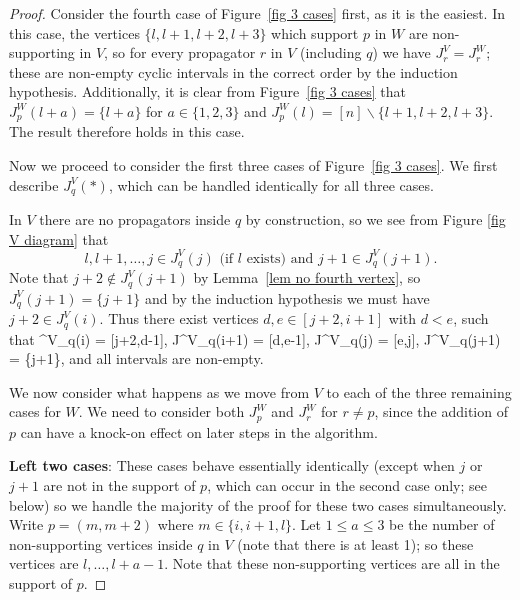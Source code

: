 \documentclass[11pt]{article}
\def\ba #1\ea{\begin{align} #1 \end{align}}
\theoremstyle{remark}
\theoremstyle{definition}
\begin{document}
\begin{proof}
Consider the fourth case of Figure~\ref{fig 3 cases} first, as it is the easiest.  In this case, the vertices ${\{l,l+1,l+2,l+3\}}$ which support $p$ in $W$ are non-supporting in $V$, so for every propagator $r$ in $V$ (including $q$) we have $J_r^{V} = J_r^{W}$; these are non-empty cyclic intervals in the correct order by the induction hypothesis.  Additionally, it is clear from Figure~\ref{fig 3 cases} that $J_p^{W}(l+a) = \{l+a\}$ for $a\in\{1,2,3\}$ and $J_p^{W}(l) = [n] \backslash \{l+1, l+2, l+3\}$. The result therefore holds in this case.


Now we proceed to consider the first three cases of Figure~\ref{fig 3 cases}.
We first describe $J_q^{V}(*)$, which can be handled identically for all three cases.

In $V$ there are no propagators inside $q$ by construction, so we see from Figure \ref{fig V diagram} that
\[l, l+1, \ldots ,j \in J^{V}_q(j) \text{ (if $l$ exists) and }  j+1 \in J^{V}_q(j+1).\]
Note that $j+2 \not\in J^{V}_q(j+1)$ by Lemma~\ref{lem no fourth vertex}, so  $J^{V}_q(j+1) = \{j+1\}$ and by the induction hypothesis we must have $j+2 \in J^{V}_q(i)$. Thus there exist vertices $d,e \in [j+2,i+1]$ with $d <e$, such that
\ba J^{V}_q(i) = [j+2,d-1], \quad J^{V}_q(i+1) = [d,e-1], \quad J^{V}_q(j) = [e,j], \quad J^{V}_q(j+1) = \{j+1\}, \label{deeqs}\ea
and all intervals are non-empty.




We now consider what happens as we move from $V$ to each of the three remaining cases for $W$. We need to consider both $J^{W}_p$ and $J^{W}_r$ for $r \neq p$, since the addition of $p$ can have a knock-on effect on later steps in the algorithm.


\textbf{Left two cases}: These cases behave essentially identically (except when $j$ or $j+1$ are not in the support of $p$, which can occur in the second case only; see below) so we handle the majority of the proof for these two cases simultaneously. Write $p=(m,m+2)$ where $m\in \{i, i+1, l\}$. Let $1\leq a\leq 3$ be the number of non-supporting vertices inside $q$ in $V$ (note that there is at least 1); so these vertices are $l, \ldots, l+a-1$.  Note that these non-supporting vertices are all in the support of $p$. 


\end{proof}
\end{document}
